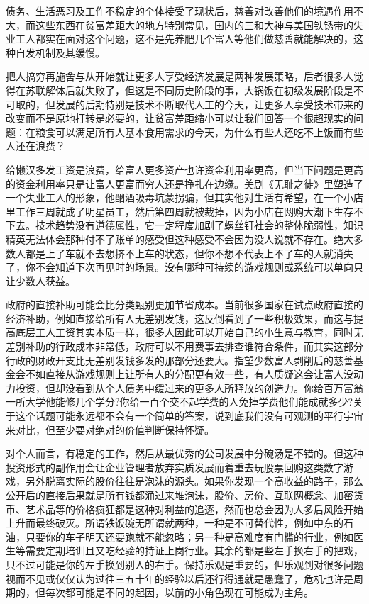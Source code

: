 \documentclass[
]{book}
\begin{document}
债务、生活恶习及工作不稳定的个体接受了现状后，慈善对改善他们的境遇作用不大，而这些东西在贫富差距大的地方特别常见，国内的三和大神与美国铁锈带的失业工人都实在面对这个问题，这不是先养肥几个富人等他们做慈善就能解决的，这种自发机制及其缓慢。

把人搞穷再施舍与从开始就让更多人享受经济发展是两种发展策略，后者很多人觉得在苏联解体后就失败了，但这是不同历史阶段的事，大锅饭在初级发展阶段是不可取的，但发展的后期特别是技术不断取代人工的今天，让更多人享受技术带来的改变而不是原地打转是必要的，让贫富差距缩小可以让我们回答一个很超现实的问题：在粮食可以满足所有人基本食用需求的今天，为什么有些人还吃不上饭而有些人还在浪费？

给懒汉多发工资是浪费，给富人更多资产也许资金利用率更高，但当下问题是更高的资金利用率只是让富人更富而穷人还是挣扎在边缘。美剧《无耻之徒》里塑造了一个失业工人的形象，他酗酒吸毒坑蒙拐骗，但其实他对生活有希望，在一个小店里工作三周就成了明星员工，然后第四周就被裁掉，因为小店在网购大潮下生存不下去。技术趋势没有道德属性，它一定程度加剧了螺丝钉社会的整体脆弱性，知识精英无法体会那种付不了账单的感受但这种感受不会因为没人说就不存在。绝大多数人都是上了车就不去想挤不上车的状态，但你不想不代表上不了车的人就消失了，你不会知道下次再见时的场景。没有哪种可持续的游戏规则或系统可以单向只让少数人获益。

政府的直接补助可能会比分类甄别更加节省成本。当前很多国家在试点政府直接的经济补助，例如直接给所有人无差别发钱，这反倒看到了一些积极效果，而这与提高底层工人工资其实本质一样，很多人因此可以开始自己的小生意与教育，同时无差别补助的行政成本非常低，政府可以不用费事去排查谁符合条件，而其实这部分行政的财政开支比无差别发钱多发的那部分还要大。指望少数富人剥削后的慈善基金会不如直接从游戏规则上让所有人的分配更有效一些，有人质疑这会让富人没动力投资，但却没看到从个人债务中缓过来的更多人所释放的创造力。你给百万富翁一所大学他能修几个学分?你给一百个交不起学费的人免掉学费他们能成就多少?关于这个话题可能永远都不会有一个简单的答案，说到底我们没有可观测的平行宇宙来对比，但至少要对绝对的价值判断保持怀疑。

对个人而言，有稳定的工作，然后从最优秀的公司发展中分碗汤是不错的。但这种投资形式的副作用会让企业管理者放弃实质发展而着重去玩股票回购这类数字游戏，另外脱离实际的股价往往是泡沫的源头。如果你发现一个高收益的路子，那么公开后的直接后果就是所有钱都涌过来堆泡沫，股价、房价、互联网概念、加密货币、艺术品等的价格疯狂都是这种对利益的追逐，然而也总会因为人多后风险开始上升而最终破灭。所谓铁饭碗无所谓就两种，一种是不可替代性，例如中东的石油，只要你的车子明天还要跑就不能忽略；另一种是高难度有门槛的行业，例如医生等需要定期培训且又吃经验的持证上岗行业。其余的都是些左手换右手的把戏，只不过可能是你的左手换到别人的右手。保持乐观是重要的，但乐观到对很多问题视而不见或仅仅认为过往三五十年的经验以后还行得通就是愚蠢了，危机也许是周期的，但每次都可能是不同的起因，以前的小⻆色现在可能成为主⻆。
\end{document}

